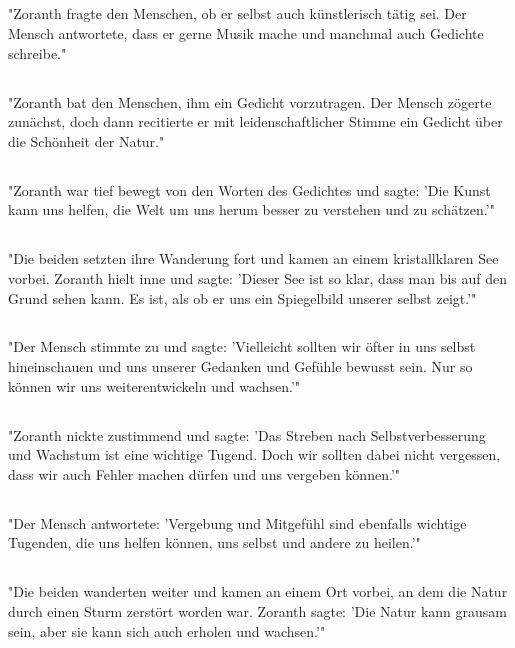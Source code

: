 \documentclass{article}
\begin{document}
\subsection{}
"Zoranth fragte den Menschen, ob er selbst auch künstlerisch tätig sei. Der Mensch antwortete, dass er gerne Musik mache und manchmal auch Gedichte schreibe."
\subsection{}
"Zoranth bat den Menschen, ihm ein Gedicht vorzutragen. Der Mensch zögerte zunächst, doch dann recitierte er mit leidenschaftlicher Stimme ein Gedicht über die Schönheit der Natur."
\subsection{}
"Zoranth war tief bewegt von den Worten des Gedichtes und sagte: 'Die Kunst kann uns helfen, die Welt um uns herum besser zu verstehen und zu schätzen.'"
\subsection{}
"Die beiden setzten ihre Wanderung fort und kamen an einem kristallklaren See vorbei. Zoranth hielt inne und sagte: 'Dieser See ist so klar, dass man bis auf den Grund sehen kann. Es ist, als ob er uns ein Spiegelbild unserer selbst zeigt.'"
\subsection{}
"Der Mensch stimmte zu und sagte: 'Vielleicht sollten wir öfter in uns selbst hineinschauen und uns unserer Gedanken und Gefühle bewusst sein. Nur so können wir uns weiterentwickeln und wachsen.'"
\subsection{}
"Zoranth nickte zustimmend und sagte: 'Das Streben nach Selbstverbesserung und Wachstum ist eine wichtige Tugend. Doch wir sollten dabei nicht vergessen, dass wir auch Fehler machen dürfen und uns vergeben können.'"
\subsection{}
"Der Mensch antwortete: 'Vergebung und Mitgefühl sind ebenfalls wichtige Tugenden, die uns helfen können, uns selbst und andere zu heilen.'"
\subsection{}
"Die beiden wanderten weiter und kamen an einem Ort vorbei, an dem die Natur durch einen Sturm zerstört worden war. Zoranth sagte: 'Die Natur kann grausam sein, aber sie kann sich auch erholen und wachsen.'"
\end{document}
